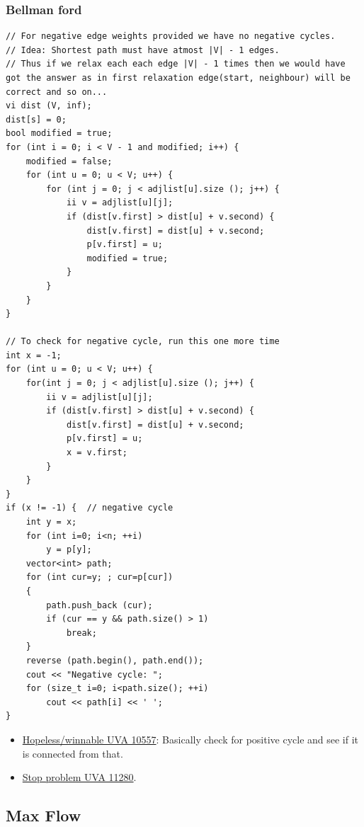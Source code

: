 \documentclass[8pt, a4paper, oneside, twocolumn]{extarticle}
\begin{document}
\subsubsection{Bellman ford}
\begin{verbatim} 
// For negative edge weights provided we have no negative cycles.
// Idea: Shortest path must have atmost |V| - 1 edges.
// Thus if we relax each each edge |V| - 1 times then we would have got the answer as in first relaxation edge(start, neighbour) will be correct and so on...
vi dist (V, inf);
dist[s] = 0;
bool modified = true;
for (int i = 0; i < V - 1 and modified; i++) {
    modified = false;
    for (int u = 0; u < V; u++) {
        for (int j = 0; j < adjlist[u].size (); j++) {
            ii v = adjlist[u][j];
            if (dist[v.first] > dist[u] + v.second) {
                dist[v.first] = dist[u] + v.second;
                p[v.first] = u;
                modified = true;
            }
        }
    }
}

// To check for negative cycle, run this one more time
int x = -1;
for (int u = 0; u < V; u++) {
    for(int j = 0; j < adjlist[u].size (); j++) {
        ii v = adjlist[u][j];
        if (dist[v.first] > dist[u] + v.second) {
            dist[v.first] = dist[u] + v.second;
            p[v.first] = u;
            x = v.first;
        }
    }
}
if (x != -1) {  // negative cycle
    int y = x;
    for (int i=0; i<n; ++i)
        y = p[y];
    vector<int> path;
    for (int cur=y; ; cur=p[cur])
    {
        path.push_back (cur);
        if (cur == y && path.size() > 1)
            break;
    }
    reverse (path.begin(), path.end());
    cout << "Negative cycle: ";
    for (size_t i=0; i<path.size(); ++i)
        cout << path[i] << ' ';
}
\end{verbatim}
\begin{itemize}
    \item \href{}{Hopeless/winnable UVA 10557}: Basically check for positive cycle and see if it is connected from that.
    \item \href{https://github.com/sourabh2311/Competitive-Programming/blob/master/Summer%202017/UVA_11280.cpp}{Stop problem UVA 11280}.
\end{itemize}
\subsection{Max Flow}
\end{document}
